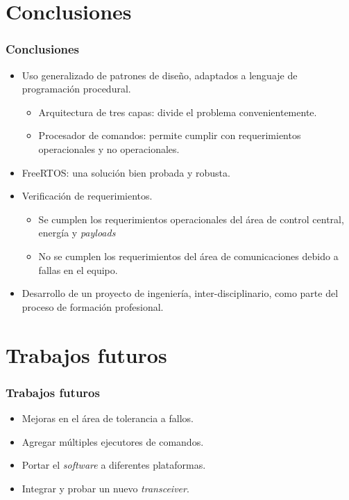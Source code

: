 \documentclass[xcolor=dvipsnames]{beamer}
\begin{document}
\begin{frame}[allowframebreaks]
    \end{frame}
    

    \section{Conclusiones}
    \begin{frame}
        \frametitle{Conclusiones}
        \begin{itemize}
            \item Uso generalizado de patrones de diseño, adaptados a lenguaje de programación procedural.
            \begin{itemize}
                \item Arquitectura de tres capas: divide el problema convenientemente.
                \item Procesador de comandos: permite cumplir con requerimientos operacionales y no operacionales.
            \end{itemize}
            
            \item FreeRTOS: una solución bien probada y robusta.
            \item Verificación de requerimientos.
            \begin{itemize}
                \item Se cumplen los requerimientos operacionales del área de control central, energía y \textit{payloads}
                \item No se cumplen los requerimientos del área de comunicaciones debido a fallas en el equipo.
            \end{itemize}
            \item Desarrollo de un proyecto de ingeniería, inter-disciplinario, como parte del proceso de formación profesional.

        \end{itemize}

    \end{frame}
    
    \section{Trabajos futuros}
    \begin{frame}
        \frametitle{Trabajos futuros}
        \begin{itemize}
            \item Mejoras en el área de tolerancia a fallos.
            \item Agregar múltiples ejecutores de comandos.
            \item Portar el \textit{software} a diferentes plataformas.
            \item Integrar y probar un nuevo \textit{transceiver}.
        \end{itemize}

    \end{frame}
    
\end{document}
